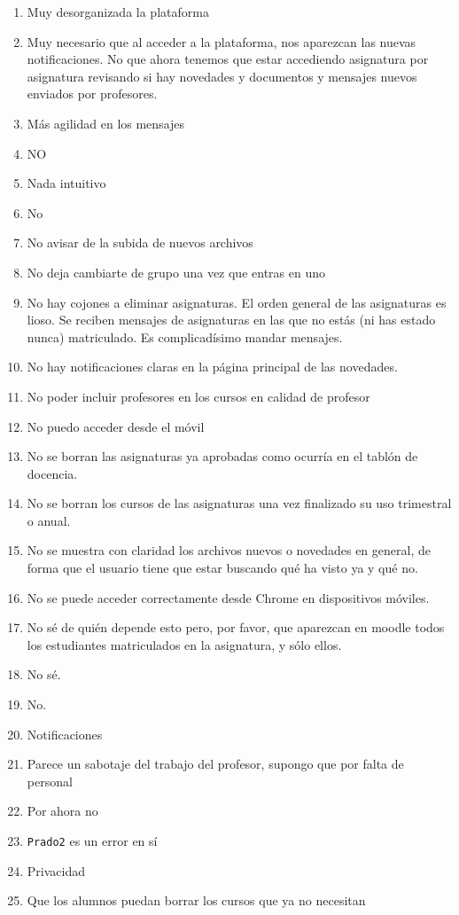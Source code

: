 \begin{enumerate}
\item Muy desorganizada la plataforma
\item Muy necesario que al acceder a la plataforma, nos aparezcan las nuevas notificaciones. No que ahora tenemos que estar accediendo asignatura por asignatura revisando si hay novedades y documentos y mensajes nuevos enviados por profesores.
\item Más agilidad en los mensajes
\item NO
\item Nada intuitivo
\item No
\item No avisar de la subida de nuevos archivos
\item No deja cambiarte de grupo una vez que entras en uno
\item No hay cojones a eliminar asignaturas. El orden general de las asignaturas es lioso. Se reciben mensajes de asignaturas en las que no estás (ni has estado nunca) matriculado. Es complicadísimo mandar mensajes.
\item No hay notificaciones claras en la página principal de las novedades.
\item No poder incluir profesores en los cursos en calidad de profesor
\item No puedo acceder desde el móvil
\item No se borran las asignaturas ya aprobadas como ocurría en el tablón de docencia.
\item No se borran los cursos de las asignaturas una vez finalizado su uso trimestral o anual.
\item No se muestra con claridad los archivos nuevos o novedades en general, de forma que el usuario tiene que estar buscando qué ha visto ya y qué no.
\item No se puede acceder correctamente desde Chrome en dispositivos móviles.
\item No sé de quién depende esto pero, por favor, que aparezcan en moodle todos los estudiantes matriculados en la asignatura, y sólo ellos.
\item No sé.
\item No.
\item Notificaciones
\item Parece un sabotaje del trabajo del profesor, supongo que por falta de personal
\item Por ahora no
\item \texttt{Prado2} es un error en sí
\item Privacidad
\item Que los alumnos puedan borrar los cursos que ya no necesitan

\end{enumerate}
